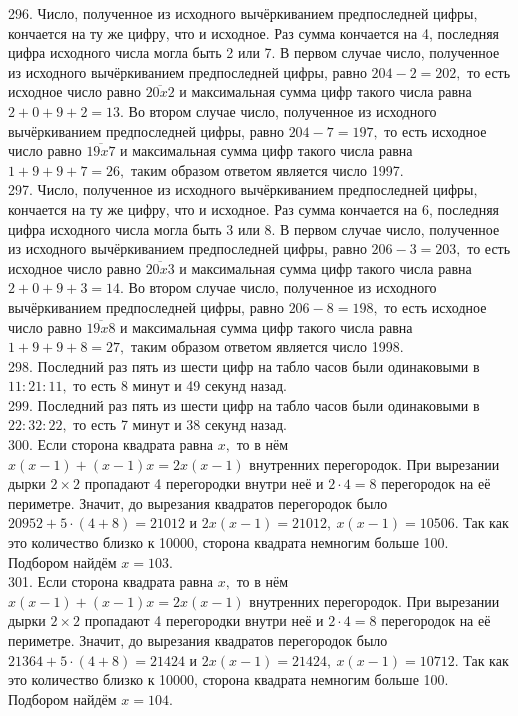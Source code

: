 296. Число, полученное из исходного вычёркиванием предпоследней цифры, кончается на ту же цифру, что и исходное. Раз сумма кончается на 4, последняя цифра исходного числа могла быть 2 или 7. В первом случае число, полученное из исходного вычёркиванием предпоследней цифры, равно $204-2=202,$ то есть исходное число равно $\overline{20x2}$ и максимальная сумма цифр такого числа равна $2+0+9+2=13.$ Во втором случае число, полученное из исходного вычёркиванием предпоследней цифры, равно $204-7=197,$ то есть исходное число равно $\overline{19x7}$ и максимальная сумма цифр такого числа равна $1+9+9+7=26,$ таким образом ответом является число 1997.\\
297. Число, полученное из исходного вычёркиванием предпоследней цифры, кончается на ту же цифру, что и исходное. Раз сумма кончается на 6, последняя цифра исходного числа могла быть 3 или 8. В первом случае число, полученное из исходного вычёркиванием предпоследней цифры, равно $206-3=203,$ то есть исходное число равно $\overline{20x3}$ и максимальная сумма цифр такого числа равна $2+0+9+3=14.$ Во втором случае число, полученное из исходного вычёркиванием предпоследней цифры, равно $206-8=198,$ то есть исходное число равно $\overline{19x8}$ и максимальная сумма цифр такого числа равна $1+9+9+8=27,$ таким образом ответом является число 1998.\\
298. Последний раз пять из шести цифр на табло часов были одинаковыми в $11:21:11,$ то есть 8 минут и 49 секунд назад.\\
299. Последний раз пять из шести цифр на табло часов были одинаковыми в $22:32:22,$ то есть 7 минут и 38 секунд назад.\\
300. Если сторона квадрата равна $x,$ то в нём $x(x-1)+(x-1)x=2x(x-1)$ внутренних перегородок. При вырезании дырки $2\times2$ пропадают 4 перегородки внутри неё и $2\cdot4=8$ перегородок на её периметре. Значит, до вырезания квадратов перегородок было $20952+5\cdot(4+8)=21012$ и $2x(x-1)=21012,\ x(x-1)=10506.$ Так как это количество близко к 10000, сторона квадрата немногим больше 100. Подбором найдём $x=103.$\\
301. Если сторона квадрата равна $x,$ то в нём $x(x-1)+(x-1)x=2x(x-1)$ внутренних перегородок. При вырезании дырки $2\times2$ пропадают 4 перегородки внутри неё и $2\cdot4=8$ перегородок на её периметре. Значит, до вырезания квадратов перегородок было $21364+5\cdot(4+8)=21424$ и $2x(x-1)=21424,\ x(x-1)=10712.$ Так как это количество близко к 10000, сторона квадрата немногим больше 100. Подбором найдём $x=104.$\\
